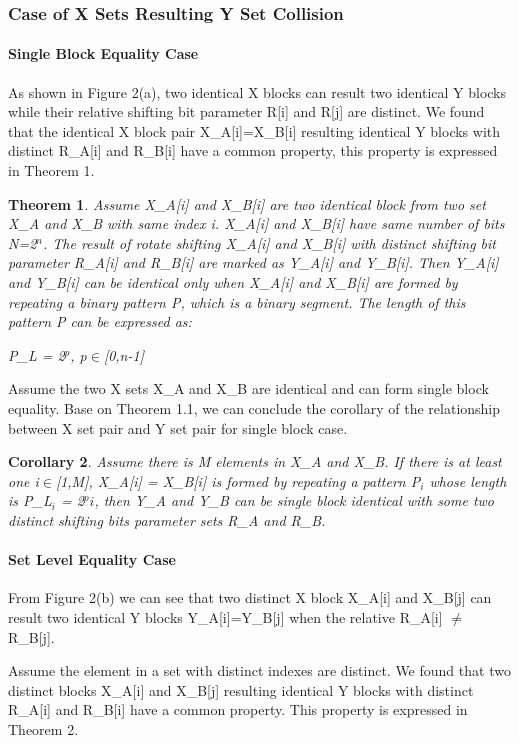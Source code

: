 \documentclass{article}
\newtheorem{theorem}{Theorem}[section]
\newtheorem{corollary}[theorem]{Corollary}
\begin{document}
\subsubsection{Case of X Sets Resulting Y Set Collision}
\paragraph{Single Block Equality Case}
As shown in Figure 2(a), two identical X blocks can result two identical Y blocks while their relative shifting bit parameter R[i] and R[j] are distinct. 
We found that the identical X block pair X\_A[i]=X\_B[i] resulting identical Y blocks with distinct R\_A[i] and R\_B[i] have a common property, this property is expressed in Theorem 1.

\begin{theorem}
Assume X\_A[i] and X\_B[i] are two identical block from two set X\_A and X\_B with same index i. X\_A[i] and X\_B[i] have same number of bits N=2$^n$. The result of rotate shifting X\_A[i] and X\_B[i] with distinct shifting bit parameter R\_A[i] and R\_B[i] are marked as Y\_A[i] and Y\_B[i]. Then Y\_A[i] and Y\_B[i] can be identical only when X\_A[i] and X\_B[i] are formed by repeating a binary pattern P, which is a binary segment. The length of this pattern P can be expressed as:

	P\_L = 2$^p$, p$\in$[0,n-1]
\end{theorem}

Assume the two X sets X\_A and X\_B are identical and can  form single block equality. Base on Theorem 1.1, we can conclude the corollary of the relationship between X set pair and Y set pair for single block case. 
\begin{corollary}
Assume there is M elements in X\_A and X\_B. If there is at least one i$\in$[1,M], X\_A[i] = X\_B[i] is formed by repeating a pattern P$_i$ whose length is P\_L$_i$ = 2$^pi$, then Y\_A and Y\_B can be single block identical with some two distinct shifting bits parameter sets R\_A and R\_B.
\end{corollary} 

\paragraph{Set Level Equality Case}
From Figure 2(b) we can see that two distinct X block X\_A[i] and X\_B[j] can result two identical Y blocks Y\_A[i]=Y\_B[j] when the relative R\_A[i] $\neq$ R\_B[j]. 

Assume the element in a set with distinct indexes are distinct. We found that two distinct blocks X\_A[i] and X\_B[j] resulting identical Y blocks with distinct R\_A[i] and R\_B[i] have a common property. This property is expressed in Theorem 2.
\end{document}
